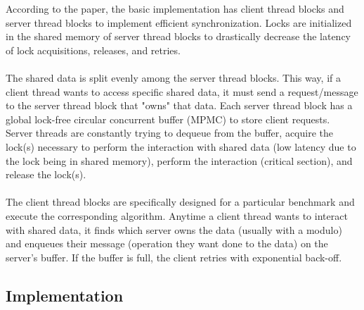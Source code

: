 \documentclass{article}
\begin{document}
According to the paper, the basic implementation has client thread blocks and server thread blocks to implement efficient synchronization. Locks are initialized in the shared memory of server thread blocks to drastically decrease the latency of lock acquisitions, releases, and retries.
\\
\\
The shared data is split evenly among the server thread blocks. This way, if a client thread wants to access specific shared data, it must send a request/message to the server thread block that "owns" that data. Each server thread block has a global lock-free circular concurrent buffer (MPMC) to store client requests. Server threads are constantly trying to dequeue from the buffer, acquire the lock(s) necessary to perform the interaction with shared data (low latency due to the lock being in shared memory), perform the interaction (critical section), and release the lock(s).
\\
\\
The client thread blocks are specifically designed for a particular benchmark and execute the corresponding algorithm. Anytime a client thread wants to interact with shared data, it finds which server owns the data (usually with a modulo) and enqueues their message (operation they want done to the data) on the server's buffer. If the buffer is full, the client retries with exponential back-off.

\subsection{Implementation}
\end{document}
